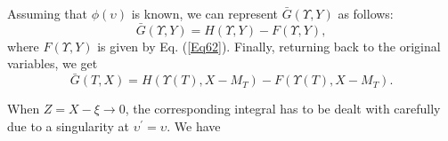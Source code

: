 \documentclass{article}
\begin{document}
Assuming that $\phi \left( \upsilon \right) $ is known, we can represent $%
\bar{G}\left( \Upsilon ,Y\right) $ as follows:%
\begin{equation}
\bar{G}\left( \Upsilon ,Y\right) =H\left( \Upsilon ,Y\right) -F\left(
\Upsilon ,Y\right) ,  \label{Eq65}
\end{equation}%
where $F\left( \Upsilon ,Y\right) $ is given by Eq. (\ref{Eq62}). Finally,
returning back to the original variables, we get%
\begin{equation}
\bar{G}\left( T,X\right) =H\left( \Upsilon \left( T\right) ,X-M_{T}\right)
-F\left( \Upsilon \left( T\right) ,X-M_{T}\right) .  \label{Eq67}
\end{equation}

When $Z=X-\xi \rightarrow 0$, the corresponding integral has to be dealt
with carefully due to a singularity at $\upsilon ^{\prime }=\upsilon $. We
have
\end{document}
